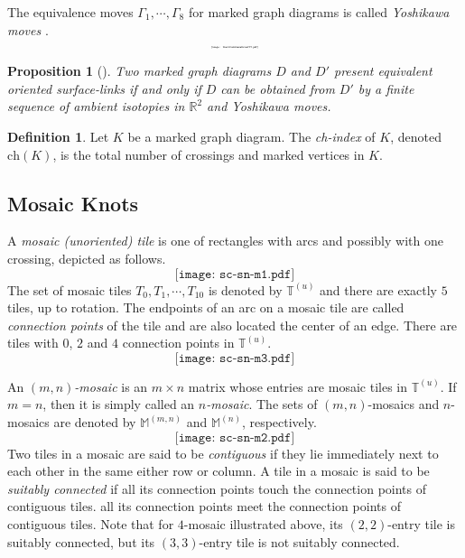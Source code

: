 \documentclass{article}
\newtheorem{proposition}[theorem]{Proposition}
\theoremstyle{definition}
\newtheorem{definition}{Definition}
\begin{document}
The equivalence moves $\Gamma_{1}, \cdots, \Gamma_{8}$ for marked graph diagrams is called \textit{ Yoshikawa moves} \cite{Yoshikawa}.
\[\scalebox{0.2}{\texttt{[image: UnoriYoshikawaMovesPPT.pdf]}}\]


\begin{proposition}[\cite{KeartonKurlin,Swenton,Yoshikawa}]
Two marked graph diagrams $D$ and $D'$ present equivalent oriented surface-links if and only if $D$ can be obtained from $D'$ by a finite sequence of ambient isotopies in $\mathbb{R}^{2}$ and Yoshikawa moves.
\end{proposition}

\begin{definition}
Let $K$ be a marked graph diagram. The \textit{ch-index} of $K$, denoted 
$\mathrm{ch}(K)$, is the total number of crossings and marked vertices in $K$.
\end{definition}


\subsection{\large\textbf{Mosaic Knots}}\label{MK}


A \textit{mosaic (unoriented) tile} is one of rectangles with arcs and possibly with one crossing, depicted as follows.
\[\texttt{[image: sc-sn-m1.pdf]}\]
The set of mosaic tiles $T_{0}, T_{1}, \cdots, T_{10}$ is denoted by $\mathbb{T}^{(u)}$ and
there are exactly $5$ tiles, up to rotation.
The endpoints of an arc on a mosaic tile are called \textit{connection points} of the tile and are also located the center of an edge. 
There are tiles with $0$, $2$ and $4$ connection points in $\mathbb{T}^{(u)}$. 
\[\texttt{[image: sc-sn-m3.pdf]}\]


An \textit{$(m, n)$-mosaic} is an $m\times n$ matrix whose entries are mosaic tiles in $\mathbb{T}^{(u)}$.
If $m=n$, then it is simply called an \textit{$n$-mosaic}.
The sets of $(m, n)$-mosaics and $n$-mosaics are denoted by $\mathbb{M}^{(m, n)}$ and $\mathbb{M}^{(n)}$, respectively.
\[\texttt{[image: sc-sn-m2.pdf]}\]
Two tiles in a mosaic are said to be \textit{contiguous} if they lie immediately next to each other in the same either row or column.
A tile in a mosaic is said to be \textit{suitably connected} if all its connection points touch the connection points of contiguous tiles. 
all its connection points meet the connection points of contiguous tiles.
Note that for $4$-mosaic illustrated above, its $(2, 2)$-entry tile is suitably connected, but its $(3,3)$-entry tile is not suitably connected. 
\end{document}
